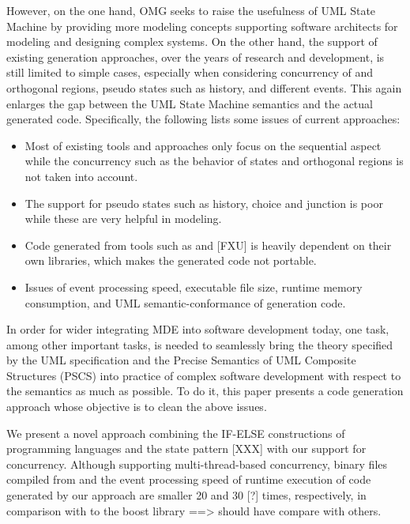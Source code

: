 However, on the one hand, OMG seeks to raise the usefulness of UML State Machine by providing more modeling concepts supporting software architects for modeling and designing complex systems. 
On the other hand, the support of existing generation approaches, over the years of research and development, is still limited to simple cases, especially when considering concurrency of  and orthogonal regions, pseudo states such as history, and different events. 
This again enlarges the gap between the UML State Machine semantics and the actual generated code.
Specifically, the following lists some issues of current approaches:

\begin{itemize}
	\item Most of existing tools and approaches only focus on the sequential aspect while the concurrency such as the  behavior of states and orthogonal regions is not taken into account.
	
	\item The support for pseudo states such as history, choice and junction is poor while these are very helpful in modeling.
	
	\item Code generated from tools such as \cite{ibm_rhapsody} and [FXU] is heavily dependent on their own libraries, which makes the generated code not portable.
	
	\item Issues of event processing speed, executable file size, runtime memory consumption, and UML semantic-conformance of generation code. 
\end{itemize}

In order for wider integrating MDE into software development today, one task, among other important tasks, is needed to seamlessly bring the theory specified by the UML specification and the Precise Semantics of UML Composite Structures (PSCS) \cite{OMG2015} into practice of complex software development with respect to the semantics as much as possible. 
To do it, this paper presents a code generation approach whose objective is to clean the above issues. 

We present a novel approach combining the IF-ELSE constructions of programming languages and the state pattern [XXX] with our support for concurrency. 
Although supporting multi-thread-based concurrency, binary files compiled from and the event processing speed of runtime execution of code generated by our approach are smaller 20 and 30 [?] times, respectively, in comparison with to the boost library ==> should have compare with others.
  
